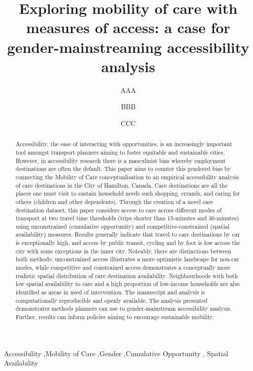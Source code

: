 \documentclass[
  authoryear,
  preprint,
  3p]{elsarticle}
\begin{document}
\begin{frontmatter}
\title{Exploring mobility of care with measures of access: a case for
gender-mainstreaming accessibility analysis}
\author[]{AAA%
%
}
\author[]{BBB%
%
}
\author[]{CCC%
%
}





        
\begin{abstract}
Accessibility, the ease of interacting with opportunities, is an
increasingly important tool amongst transport planners aiming to foster
equitable and sustainable cities. However, in accessibility research
there is a masculinist bias whereby employment destinations are often
the default. This paper aims to counter this gendered bias by connecting
the Mobility of Care conceptualisation to an empirical accessibility
analysis of care destinations in the City of Hamilton, Canada. Care
destinations are all the places one must visit to sustain household
needs such shopping, errands, and caring for others (children and other
dependents). Through the creation of a novel care destination dataset,
this paper considers access to care across different modes of transport
at two travel time thresholds (trips shorter than 15-minutes and
30-minutes) using unconstrained (cumulative opportunity) and
competitive-constrained (spatial availability) measures. Results
generally indicate that travel to care destinations by car is
exceptionally high, and access by public transit, cycling and by foot is
low across the city with some exceptions in the inner city. Noteably,
there are distinctions between both methods: unconstrained access
illustrates a more optimistic landscape for non-car modes, while
competitive and constrained access demonstrates a conceptually more
realistic spatial distribution of care destination availability.
Neighbourhoods with both low spatial availability to care and a high
proportion of low-income households are also identified as areas in need
of intervention. The manuscript and analysis is computationally
reproducible and openly available. The analysis presented demonstrates
methods planners can use to gender-mainstream accessibility analysis.
Further, results can inform policies aiming to encourage sustainable
mobility.
\end{abstract}





\begin{keyword}
    Accessibility \sep Mobility of Care \sep Gender \sep Cumulative
Opportunity \sep 
    Spatial Availability
\end{keyword}
\end{frontmatter}
    \ifdefined\Shaded\renewenvironment{Shaded}{\begin{tcolorbox}[enhanced, interior hidden, breakable, borderline west={3pt}{0pt}{shadecolor}, boxrule=0pt, frame hidden, sharp corners]}{\end{tcolorbox}}\fi
\end{document}

